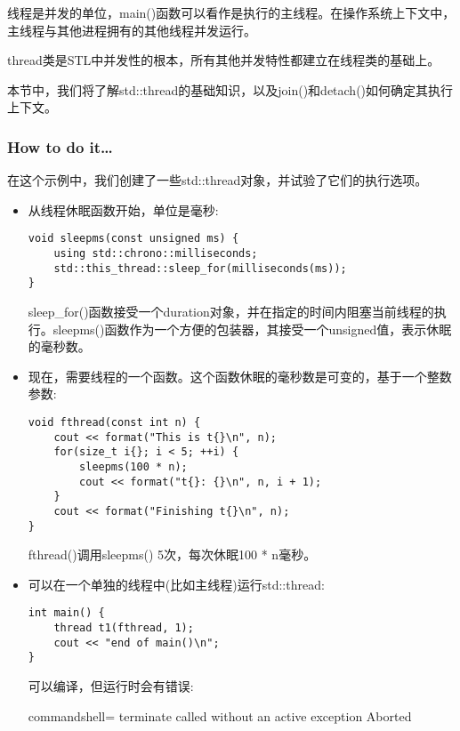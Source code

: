 
线程是并发的单位，main()函数可以看作是执行的主线程。在操作系统上下文中，主线程与其他进程拥有的其他线程并发运行。

thread类是STL中并发性的根本，所有其他并发特性都建立在线程类的基础上。

本节中，我们将了解std::thread的基础知识，以及join()和detach()如何确定其执行上下文。

\subsubsection{How to do it…}

在这个示例中，我们创建了一些std::thread对象，并试验了它们的执行选项。

\begin{itemize}
\item 
从线程休眠函数开始，单位是毫秒:

\begin{lstlisting}[style=styleCXX]
void sleepms(const unsigned ms) {
	using std::chrono::milliseconds;
	std::this_thread::sleep_for(milliseconds(ms));
}
\end{lstlisting}

sleep\_for()函数接受一个duration对象，并在指定的时间内阻塞当前线程的执行。sleepms()函数作为一个方便的包装器，其接受一个unsigned值，表示休眠的毫秒数。

\item 
现在，需要线程的一个函数。这个函数休眠的毫秒数是可变的，基于一个整数参数:

\begin{lstlisting}[style=styleCXX]
void fthread(const int n) {
	cout << format("This is t{}\n", n);
	for(size_t i{}; i < 5; ++i) {
		sleepms(100 * n);
		cout << format("t{}: {}\n", n, i + 1);
	}
	cout << format("Finishing t{}\n", n);
}
\end{lstlisting}

fthread()调用sleepms() 5次，每次休眠100 * n毫秒。

\item 
可以在一个单独的线程中(比如主线程)运行std::thread:

\begin{lstlisting}[style=styleCXX]
int main() {
	thread t1(fthread, 1);
	cout << "end of main()\n";
}
\end{lstlisting}

可以编译，但运行时会有错误:

\begin{tcblisting}{commandshell={}}
terminate called without an active exception Aborted
\end{tcblisting}


\end{itemize}
